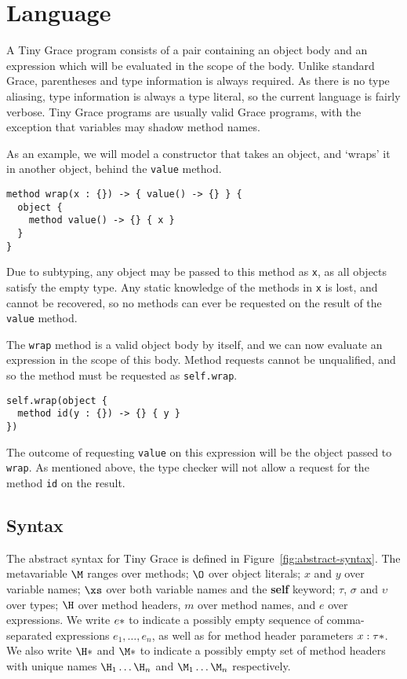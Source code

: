 \section{Language}\label{sec:language}

A Tiny Grace program consists of a pair containing an object body and an
expression which will be evaluated in the scope of the body. Unlike standard
Grace, parentheses and type information is always required.  As there is no type
aliasing, type information is always a type literal, so the current language is
fairly verbose.  Tiny Grace programs are usually valid Grace programs, with the
exception that variables may shadow method names.

As an example, we will model a constructor that takes an object, and `wraps' it
in another object, behind the \lstinline{value} method.

\begin{lstlisting}
method wrap(x : {}) -> { value() -> {} } {
  object {
    method value() -> {} { x }
  }
}
\end{lstlisting}

\noindent Due to subtyping, any object may be passed to this method as
\lstinline{x}, as all objects satisfy the empty type.  Any static knowledge of
the methods in \lstinline{x} is lost, and cannot be recovered, so no methods can
ever be requested on the result of the \lstinline{value} method.

The \lstinline{wrap} method is a valid object body by itself, and we can now
evaluate an expression in the scope of this body.  Method requests cannot be
unqualified, and so the method must be requested as \lstinline{self.wrap}.

\begin{lstlisting}
self.wrap(object {
  method id(y : {}) -> {} { y }
})
\end{lstlisting}

\noindent The outcome of requesting \lstinline{value} on this expression will be
the object passed to \lstinline{wrap}.  As mentioned above, the type checker
will not allow a request for the method \lstinline{id} on the result.

\subsection{Syntax}\label{sec:syntax}

The abstract syntax for Tiny Grace is defined in
Figure~\ref{fig:abstract-syntax}.  The metavariable $\M$ ranges over methods;
$\O$ over object literals; $x$ and $y$ over variable names; $\xs$ over both
variable names and the {\sffamily\bfseries self} keyword; $\tau$, $\sigma$ and
$\upsilon$ over types; $\H$ over method headers, $m$ over method names, and $e$
over expressions.  We write $\*e*$ to indicate a possibly empty sequence of
comma-separated expressions $e_1, \dots, e_n$, as well as for method header
parameters $\*x : \tau*$.  We also write $\*\H*$ and $\*\M*$ to indicate a
possibly empty set of method headers with unique names $\H_1 \dots \H_n$ and
$\M_1 \dots \M_n$ respectively.


